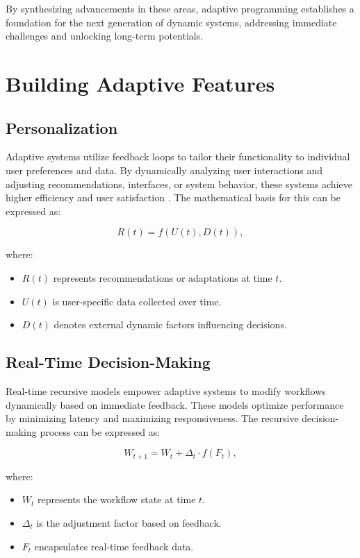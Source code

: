 \documentclass{article}
\theoremstyle{plain}
\begin{document}
By synthesizing advancements in these areas, adaptive programming establishes a foundation for the next generation of dynamic systems, addressing immediate challenges and unlocking long-term potentials.


\section{Building Adaptive Features}

\subsection{Personalization}
Adaptive systems utilize feedback loops to tailor their functionality to individual user preferences and data. By dynamically analyzing user interactions and adjusting recommendations, interfaces, or system behavior, these systems achieve higher efficiency and user satisfaction \cite{personalization_feedback}. The mathematical basis for this can be expressed as:

\begin{equation}
    R(t) = f(U(t), D(t)),
\end{equation}

where:
\begin{itemize}
    \item $R(t)$ represents recommendations or adaptations at time $t$.
    \item $U(t)$ is user-specific data collected over time.
    \item $D(t)$ denotes external dynamic factors influencing decisions.
\end{itemize}

\subsection{Real-Time Decision-Making}
Real-time recursive models empower adaptive systems to modify workflows dynamically based on immediate feedback. These models optimize performance by minimizing latency and maximizing responsiveness. The recursive decision-making process can be expressed as:

\begin{equation}
    W_{t+1} = W_t + \Delta_t \cdot f(F_t),
\end{equation}

where:
\begin{itemize}
    \item $W_t$ represents the workflow state at time $t$.
    \item $\Delta_t$ is the adjustment factor based on feedback.
    \item $F_t$ encapsulates real-time feedback data.
\end{itemize}
\end{document}

